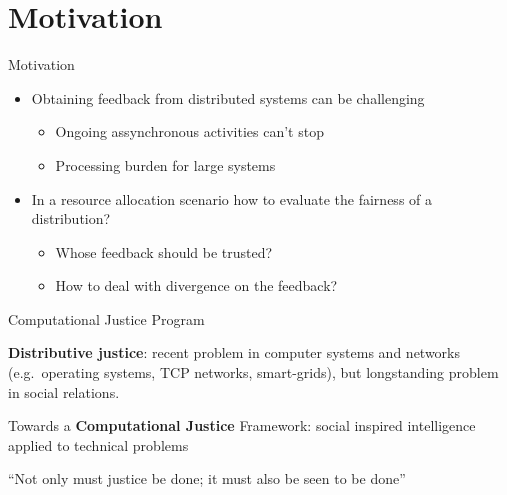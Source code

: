 \section{Motivation}\label{motivation}

\begin{frame}{Motivation}

\begin{itemize}
\tightlist
\item
  Obtaining feedback from distributed systems can be challenging

  \begin{itemize}
  \tightlist
  \item
    Ongoing assynchronous activities can't stop
  \item
    Processing burden for large systems
  \end{itemize}
\item
  In a resource allocation scenario how to evaluate the fairness of a
  distribution?

  \begin{itemize}
  \tightlist
  \item
    Whose feedback should be trusted?
  \item
    How to deal with divergence on the feedback?
  \end{itemize}
\end{itemize}

\end{frame}

\begin{frame}{Computational Justice Program}

\textbf{Distributive justice}: recent problem in computer systems and
networks (e.g.~operating systems, TCP networks, smart-grids), but
longstanding problem in social relations.

\vspace{0.3cm}

Towards a \textbf{Computational Justice} Framework: social inspired
intelligence applied to technical problems

\begin{block}{}

``Not only must justice be done; it must also be seen to be done''

\end{block}

\end{frame}

